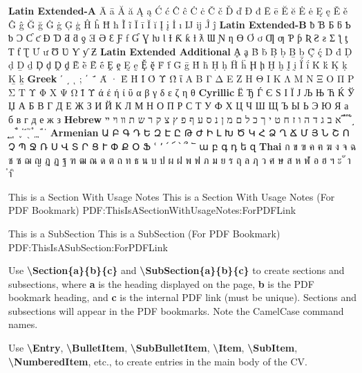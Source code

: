 \documentclass[letterpaper,MMMyyyy,nonstopmode]{simpleresumecv}
\newcommand{\Code}[1]{\mbox{\textbf{#1}}}
\newcommand{\CodeCommand}[1]{\mbox{\textbf{\textbackslash{#1}}}}
\begin{document}
\begin{Body}
{\begin{Detail}
\Item
\textbf{Latin Extended-A}
Ā ā Ă ă Ą ą Ć ć Ĉ ĉ Ċ ċ Č č Ď ď Đ đ Ē ē Ĕ ĕ Ė ė Ę ę Ě ě Ĝ ĝ Ğ ğ Ġ ġ Ģ ģ Ĥ ĥ Ħ ħ Ĩ ĩ Ī ī Ĭ ĭ Į į İ ı Ĳ ĳ Ĵ ĵ
\textbf{Latin Extended-B}
ƀ Ɓ Ƃ ƃ Ƅ ƅ Ɔ Ƈ ƈ Ɖ Ɗ Ƌ ƌ ƍ Ǝ Ə Ɛ Ƒ ƒ Ɠ Ɣ ƕ Ɩ Ɨ Ƙ ƙ ƚ ƛ Ɯ Ɲ ƞ Ɵ Ơ ơ Ƣ ƣ Ƥ ƥ Ʀ Ƨ ƨ Ʃ ƪ ƫ Ƭ ƭ Ʈ Ư ư Ʊ Ʋ Ƴ ƴ Ƶ
\textbf{Latin Extended Additional}
Ḁ ḁ Ḃ ḃ Ḅ ḅ Ḇ ḇ Ḉ ḉ Ḋ ḋ Ḍ ḍ Ḏ ḏ Ḑ ḑ Ḓ ḓ Ḕ ḕ Ḗ ḗ Ḙ ḙ Ḛ ḛ Ḝ ḝ Ḟ ḟ Ḡ ḡ Ḣ ḣ Ḥ ḥ Ḧ ḧ Ḩ ḩ Ḫ ḫ Ḭ ḭ Ḯ ḯ Ḱ ḱ Ḳ ḳ Ḵ ḵ
\textbf{Greek}
ʹ ͵ ͺ ; ΄ ΅ Ά · Έ Ή Ί Ό Ύ Ώ ΐ Α Β Γ Δ Ε Ζ Η Θ Ι Κ Λ Μ Ν Ξ Ο Π Ρ Σ Τ Υ Φ Χ Ψ Ω Ϊ Ϋ ά έ ή ί ΰ α β γ δ ε ζ η θ
\textbf{Cyrillic}
Ё Ђ Ѓ Є Ѕ І Ї Ј Љ Њ Ћ Ќ Ў Џ А Б В Г Д Е Ж З И Й К Л М Н О П Р С Т У Ф Х Ц Ч Ш Щ Ъ Ы Ь Э Ю Я а б в г д е ж з
\textbf{Hebrew}
א ב ג ד ה ו ז ח ט י ך כ ל ם מ ן נ ס ע ף פ ץ צ ק ר ש ת װ ױ ײ ֝ ֞ ֟ ֠ ֡ ֣ ֤ ֥ ֦ ֧ ֨ ֩ ֪ ֫ ֬ ֭ ֮ ֯ ְ ֱ ֒ ֓ ֔
\textbf{Armenian}
{\UseSecondaryFont
Ա Բ Գ Դ Ե Զ Է Ը Թ Ժ Ի Լ Խ Ծ Կ Հ Ձ Ղ Ճ Մ Յ Ն Շ Ո Չ Պ Ջ Ռ Ս Վ Տ Ր Ց Ւ Փ Ք Օ Ֆ ՙ ՚ ՛ ՜ ՝ ՞ ՟ ա բ գ դ ե զ}
\textbf{Thai}
{\UseSecondaryFont
ก ข ฃ ค ฅ ฆ ง จ ฉ ช ซ ฌ ญ ฎ ฏ ฐ ฑ ฒ ณ ด ต ถ ท ธ น บ ป ผ ฝ พ ฟ ภ ม ย ร ฤ ล ฦ ว ศ ษ ส ห ฬ อ ฮ ฯ ะ ั า ำ ิ}
\end{Detail}

\newpage


\begingroup
\color{red}

\Section
{This is a\newline
Section\newline
With\newline
Usage Notes}
{This is a Section With Usage Notes (For PDF Bookmark)}
{PDF:ThisIsASectionWithUsageNotes:ForPDFLink}

\SubSection
{This is a SubSection}
{This is a SubSection (For PDF Bookmark)}
{PDF:ThisIsASubSection:ForPDFLink}

\Gap
\BulletItem
Use \CodeCommand{Section\{a\}\{b\}\{c\}} and
\CodeCommand{SubSection\{a\}\{b\}\{c\}}
to create sections and subsections, where
\Code{a} is the heading displayed on the page,
\Code{b} is the PDF bookmark heading, and
\Code{c} is the internal PDF link (must be unique).
Sections and subsections will appear in the PDF bookmarks.
Note the CamelCase command names.

\Gap
\BulletItem
Use
\CodeCommand{Entry},
\CodeCommand{BulletItem},
\CodeCommand{SubBulletItem},
\CodeCommand{Item},
\CodeCommand{SubItem},
\CodeCommand{NumberedItem},
etc.,
to create entries in the main body of the CV.

}
\end{Body}
\end{document}
